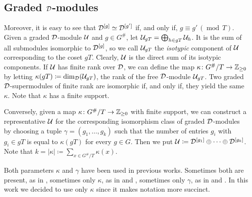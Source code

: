 

\subsection{Graded $\mathcal{D}$-modules}
Moreover, it is easy to see that $\mathcal{D}^{[g]}\simeq \mathcal{D}^{[g']}$ if, and only if,  $g \equiv g' \,(\operatorname{mod}\, T)$. 
Given a graded $\mathcal{D}$-module $\mathcal U$ and $g\in G^\#$, let $\mathcal U_{gT} = \bigoplus_{h \in gT} \mathcal U_{h}$. 
It is the sum of all submodules isomorphic to $\mathcal{D}^{[g]}$, so we call $\mathcal U_{gT}$ the \emph{isotypic} component of $\mathcal U$ corresponding to the coset $gT$. 
Clearly, $\mathcal U$ is the direct sum of its isotypic components. 
If $\mathcal U$ has finite rank over $\mathcal{D}$, we can define the map $\kappa\colon G^\#/T \to \mathbb{Z}_{\geq 0}$ by letting $\kappa (gT) \coloneqq \dim_{\mathcal{D}} (\mathcal U_{gT})$, the rank of the free $\mathcal{D}$-module $\mathcal U_{gT}$. 
Two graded $\mathcal{D}$-supermodules of finite rank are isomorphic if, and only if, they yield the same $\kappa$. 
Note that $\kappa$ has a finite support.

Conversely, given a map $\kappa\colon G^\#/T \to \mathbb{Z}_{\geq 0}$ with finite support, we can construct a representative $\mathcal U$ for the corresponding isomorphism class of graded $\mathcal{D}$-modules by choosing a tuple $\gamma = (g_1, \ldots, g_k)$ such that the number of entries $g_i$ with $g_i\in gT$ is equal to $\kappa (gT)$ for every $g\in G$. 
Then we put $\mathcal U \coloneqq \mathcal{D}^{[g_1]} \oplus \cdots \oplus \mathcal{D}^{[g_k]}$. 
Note that $k = |\kappa| \coloneqq \sum_{x\in G^\#/T} \kappa(x)$.

\begin{remark}
    Both parameters $\kappa$ and $\gamma$ have been used in previous works. 
    Sometimes both are present, as in \cite{livromicha}, sometimes only $\kappa$, as in \cite{paper-adrian} and \cite{felipe-misha}, sometimes only $\gamma$, as in \cite{paper-Qn} and \cite{paper-MAP}. 
    In this work we decided to use only $\kappa$ since it makes notation more succinct.
\end{remark}


